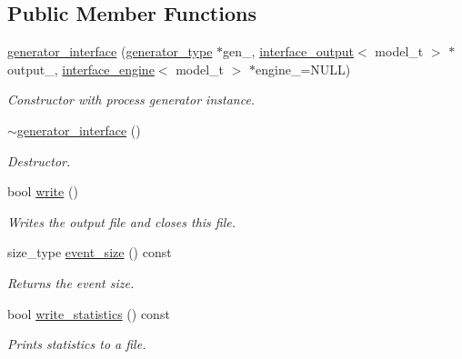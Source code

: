 \subsection*{Public Member Functions}
\begin{DoxyCompactItemize}
\item 
\hypertarget{a00242_a609d58826791fea44f886178585b6a99}{}\hyperlink{a00242_a609d58826791fea44f886178585b6a99}{generator\+\_\+interface} (\hyperlink{a00451}{generator\+\_\+type} $\ast$gen\+\_\+, \hyperlink{a00319}{interface\+\_\+output}$<$ model\+\_\+t $>$ $\ast$output\+\_\+, \hyperlink{a00318}{interface\+\_\+engine}$<$ model\+\_\+t $>$ $\ast$engine\+\_\+=N\+U\+L\+L)\label{a00242_a609d58826791fea44f886178585b6a99}

\begin{DoxyCompactList}\small\item\em Constructor with process generator instance. \end{DoxyCompactList}\item 
\hypertarget{a00242_a3c7777968ed5f4f30717315dd56cf610}{}\hyperlink{a00242_a3c7777968ed5f4f30717315dd56cf610}{$\sim$generator\+\_\+interface} ()\label{a00242_a3c7777968ed5f4f30717315dd56cf610}

\begin{DoxyCompactList}\small\item\em Destructor. \end{DoxyCompactList}\item 
bool \hyperlink{a00242_a40aafb684235b700365890c5b1bcc5dd}{write} ()
\begin{DoxyCompactList}\small\item\em Writes the output file and closes this file. \end{DoxyCompactList}\item 
\hypertarget{a00242_a629de27e2745d097f856d15b700a8754}{}size\+\_\+type \hyperlink{a00242_a629de27e2745d097f856d15b700a8754}{event\+\_\+size} () const \label{a00242_a629de27e2745d097f856d15b700a8754}

\begin{DoxyCompactList}\small\item\em Returns the event size. \end{DoxyCompactList}\item 
\hypertarget{a00242_af2d400f6139e9ee11a101c7309b60011}{}bool \hyperlink{a00242_af2d400f6139e9ee11a101c7309b60011}{write\+\_\+statistics} () const \label{a00242_af2d400f6139e9ee11a101c7309b60011}

\begin{DoxyCompactList}\small\item\em Prints statistics to a file. \end{DoxyCompactList}\end{DoxyCompactItemize}
